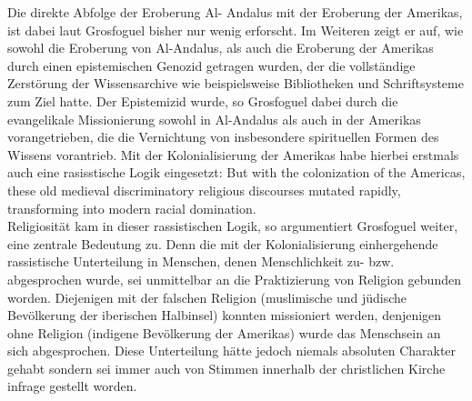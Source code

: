 Die direkte Abfolge der Eroberung Al- Andalus mit der Eroberung der Amerikas,
ist dabei laut Grosfoguel bisher nur wenig erforscht.\footnotemark
{} Im Weiteren zeigt er
auf, wie sowohl die Eroberung von Al-Andalus, als auch die Eroberung der
Amerikas durch einen epistemischen Genozid getragen wurden, der die
vollständige Zerstörung der Wissensarchive wie beispielsweise Bibliotheken und
Schriftsysteme zum Ziel hatte.\footnotemark
{}  Der Epistemizid wurde, so Grosfoguel dabei
durch die evangelikale Missionierung sowohl in Al-Andalus als auch in der
Amerikas vorangetrieben, die die Vernichtung von insbesondere spirituellen
Formen des Wissens vorantrieb. Mit der Kolonialisierung der Amerikas habe
hierbei erstmals auch eine rasisstische Logik eingesetzt: \glqq But with the
colonization of the Americas, these old medieval discriminatory religious
discourses mutated rapidly, transforming into modern racial domination. \grqq
\footnotemark {}
\\

Religiosität kam in dieser rassistischen Logik, so argumentiert Grosfoguel
weiter, eine zentrale Bedeutung zu. Denn die mit der Kolonialisierung
einhergehende rassistische Unterteilung in Menschen, denen Menschlichkeit zu-
bzw. abgesprochen wurde, sei unmittelbar an die Praktizierung von Religion
gebunden worden. Diejenigen mit der falschen Religion (muslimische und jüdische
Bevölkerung der iberischen Halbinsel) konnten missioniert werden, denjenigen
ohne Religion (indigene Bevölkerung der Amerikas) wurde das Menschsein an sich
abgesprochen.\footnotemark {} 
Diese Unterteilung hätte jedoch niemals absoluten Charakter
gehabt sondern sei immer auch von Stimmen innerhalb der christlichen Kirche
infrage gestellt worden.

